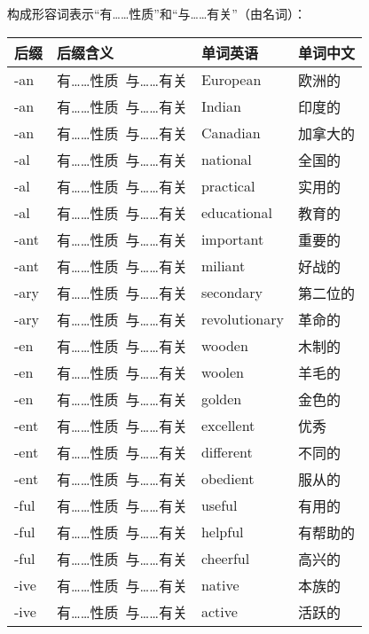 \documentclass[UTF8]{ctexart}
\begin{document}
    构成形容词表示“有……性质”和“与……有关”（由名词）：\vspace{5pt}
    \begin{table}[h!]
        \begin{center}
            \ttfamily
            \begin{tabular}{p{40pt}|p{120pt}|p{80pt}|p{80pt}}
                \hline
                后缀&后缀含义&单词英语&单词中文\\ \hline
                -an&有……性质~与……有关&European&欧洲的\\ \hline
                -an&有……性质~与……有关&Indian&印度的\\ \hline
                -an&有……性质~与……有关&Canadian&加拿大的\\ \hline
                -al&有……性质~与……有关&national&全国的\\ \hline
                -al&有……性质~与……有关&practical&实用的\\ \hline
                -al&有……性质~与……有关&educational&教育的\\ \hline
                -ant&有……性质~与……有关&important&重要的\\ \hline
                -ant&有……性质~与……有关&miliant&好战的\\ \hline
                -ary&有……性质~与……有关&secondary&第二位的\\ \hline
                -ary&有……性质~与……有关&revolutionary&革命的\\ \hline
                -en&有……性质~与……有关&wooden&木制的\\ \hline
                -en&有……性质~与……有关&woolen&羊毛的\\ \hline
                -en&有……性质~与……有关&golden&金色的\\ \hline
                -ent&有……性质~与……有关&excellent&优秀\\ \hline
                -ent&有……性质~与……有关&different&不同的\\ \hline
                -ent&有……性质~与……有关&obedient&服从的\\ \hline
                -ful&有……性质~与……有关&useful&有用的\\ \hline
                -ful&有……性质~与……有关&helpful&有帮助的\\ \hline
                -ful&有……性质~与……有关&cheerful&高兴的\\ \hline
                -ive&有……性质~与……有关&native&本族的\\ \hline
                -ive&有……性质~与……有关&active&活跃的\\ \hline

\end{tabular}
\end{center}
\end{table}
\end{document}
